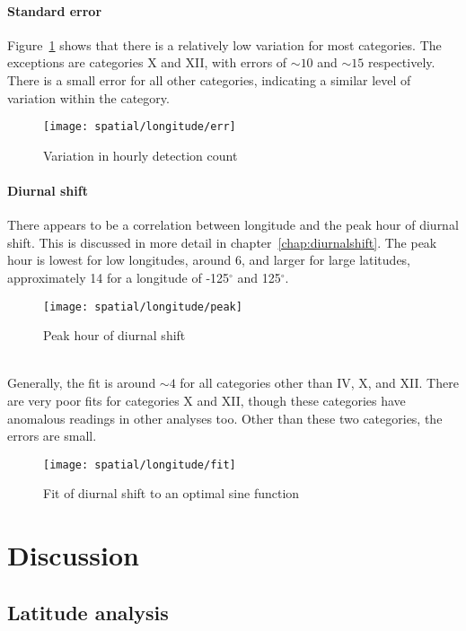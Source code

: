 \paragraph{Standard error\\}
Figure~\ref{fig:spat:lon:err} shows that there is a relatively low variation for most categories. The exceptions are categories X and XII, with errors of ${\sim 10}$ and ${\sim 15}$ respectively. There is a small error for all other categories, indicating a similar level of variation within the category.
\begin{figure}[h!]
	\centering
	\texttt{[image: spatial/longitude/err]}
	\caption{Variation in hourly detection count
		\label{fig:spat:lon:err}}
\end{figure}
\paragraph{Diurnal shift\\}
There appears to be a correlation between longitude and the peak hour of diurnal shift. This is discussed in more detail in chapter~\ref{chap:diurnalshift}. The peak hour is lowest for low longitudes, around 6, and larger for large latitudes, approximately 14 for a longitude of -125$^{\circ}$ and 125$^{\circ}$.
\begin{figure}[h!]
	\centering
	\texttt{[image: spatial/longitude/peak]}
	\caption{Peak hour of diurnal shift
		\label{fig:spat:lon:peak}}
\end{figure}\\
Generally, the fit is around ${\sim} 4$ for all categories other than IV, X, and XII. There are very poor fits for categories X and XII, though these categories have anomalous readings in other analyses too. Other than these two categories, the errors are small.
\begin{figure}[h!]
	\centering
	\texttt{[image: spatial/longitude/fit]}
	\caption{Fit of diurnal shift to an optimal sine function
		\label{fig:spat:lon:fit}}
\end{figure}

\section{Discussion}
\subsection{Latitude analysis}

